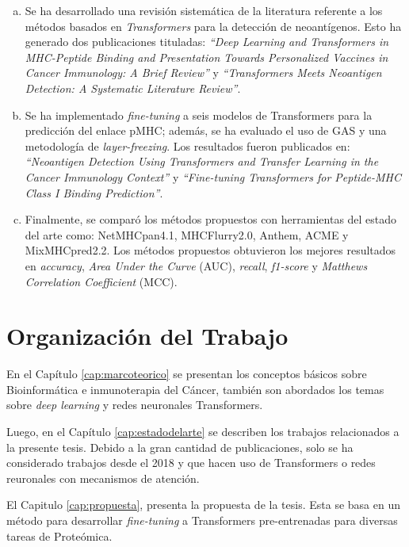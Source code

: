 \begin{enumerate}[(a)]
	\item Se ha desarrollado una revisión sistemática de la literatura referente a los métodos basados en \textit{Transformers} para la detección de neoantígenos. Esto ha generado dos publicaciones tituladas: \textit{``Deep Learning and Transformers in MHC-Peptide Binding and Presentation Towards Personalized Vaccines in Cancer Immunology: A Brief Review''} \citep{machaca2023deep} y \textit{``Transformers Meets Neoantigen Detection: A Systematic Literature Review''}.
	\item Se ha implementado \textit{fine-tuning} a seis modelos de Transformers para la predicción del enlace pMHC; además, se ha evaluado el uso de GAS y una metodología de \textit{layer-freezing}. Los resultados fueron publicados en: \textit{``Neoantigen Detection Using Transformers and Transfer Learning in the Cancer Immunology Context''} \citep{arceda2023neoantigen} y \textit{``Fine-tuning Transformers for Peptide-MHC Class I Binding Prediction''}.
	\item Finalmente, se comparó los métodos propuestos con herramientas del estado del arte como: NetMHCpan4.1, MHCFlurry2.0, Anthem, ACME y MixMHCpred2.2. Los métodos propuestos obtuvieron los mejores resultados en \textit{accuracy}, \textit{Area Under the Curve} (AUC), \textit{recall}, \textit{f1-score} y \textit{Matthews Correlation Coefficient}  (MCC).
\end{enumerate}

\section{Organización del Trabajo}
\label{sec:organizaciondeltrabajo}
En el Capítulo \ref{cap:marcoteorico} se presentan los conceptos básicos sobre Bioinformática e inmunoterapia del Cáncer, también son abordados los temas sobre \textit{deep learning} y redes neuronales Transformers.

Luego, en el Capítulo \ref{cap:estadodelarte} se describen los trabajos relacionados a la presente tesis. Debido a la gran cantidad de publicaciones, solo se ha considerado trabajos desde el 2018 y que hacen uso de Transformers o redes reuronales con mecanismos de atención.

El Capitulo \ref{cap:propuesta}, presenta la propuesta de la tesis. Esta se basa en un método para desarrollar \textit{fine-tuning} a Transformers pre-entrenadas para diversas tareas de Proteómica. 

